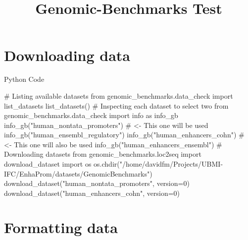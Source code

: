 \documentclass[
  letterpaper,
  DIV=11,
  numbers=noendperiod]{scrartcl}
\title{Genomic-Benchmarks Test}
\author{}
\date{}
\newenvironment{Shaded}{\begin{snugshade}}{\end{snugshade}}
\newcommand{\CommentTok}[1]{\textcolor[rgb]{0.37,0.37,0.37}{#1}}
\newcommand{\DecValTok}[1]{\textcolor[rgb]{0.68,0.00,0.00}{#1}}
\newcommand{\ImportTok}[1]{\textcolor[rgb]{0.00,0.46,0.62}{#1}}
\newcommand{\NormalTok}[1]{\textcolor[rgb]{0.00,0.23,0.31}{#1}}
\newcommand{\OperatorTok}[1]{\textcolor[rgb]{0.37,0.37,0.37}{#1}}
\newcommand{\StringTok}[1]{\textcolor[rgb]{0.13,0.47,0.30}{#1}}
\renewcommand*\contentsname{Table of contents}
\newcommand\contentsname{Table of contents}
\begin{document}
\maketitle

\renewcommand*\contentsname{Table of contents}
{
\hypersetup{linkcolor=}
\setcounter{tocdepth}{3}
\tableofcontents
}
\section{Downloading data}\label{downloading-data}

\begin{pythonheader}
Python Code
\end{pythonheader}

\begin{Shaded}
\begin{Highlighting}[]
\CommentTok{\# Listing available datasets}
\ImportTok{from}\NormalTok{ genomic\_benchmarks.data\_check }\ImportTok{import}\NormalTok{ list\_datasets}
\NormalTok{list\_datasets()}
\CommentTok{\# Inspecting each dataset to select two}
\ImportTok{from}\NormalTok{ genomic\_benchmarks.data\_check }\ImportTok{import}\NormalTok{ info }\ImportTok{as}\NormalTok{ info\_gb}
\NormalTok{info\_gb(}\StringTok{"human\_nontata\_promoters"}\NormalTok{) }\CommentTok{\# \textless{}{-} This one will be used}
\NormalTok{info\_gb(}\StringTok{"human\_ensembl\_regulatory"}\NormalTok{)}
\NormalTok{info\_gb(}\StringTok{"human\_enhancers\_cohn"}\NormalTok{)    }\CommentTok{\# \textless{}{-} This one will also be used}
\NormalTok{info\_gb(}\StringTok{"human\_enhancers\_ensembl"}\NormalTok{)}
\CommentTok{\# Downloading datasets}
\ImportTok{from}\NormalTok{ genomic\_benchmarks.loc2seq }\ImportTok{import}\NormalTok{ download\_dataset}
\ImportTok{import}\NormalTok{ os}
\NormalTok{os.chdir(}\StringTok{"/home/davidfm/Projects/UBMI{-}IFC/EnhaProm/datasets/GenomicBenchmarks"}\NormalTok{)}
\NormalTok{download\_dataset(}\StringTok{"human\_nontata\_promoters"}\NormalTok{, version}\OperatorTok{=}\DecValTok{0}\NormalTok{) }
\NormalTok{download\_dataset(}\StringTok{"human\_enhancers\_cohn"}\NormalTok{, version}\OperatorTok{=}\DecValTok{0}\NormalTok{) }
\end{Highlighting}
\end{Shaded}

\section{Formatting data}\label{formatting-data}
\end{document}
